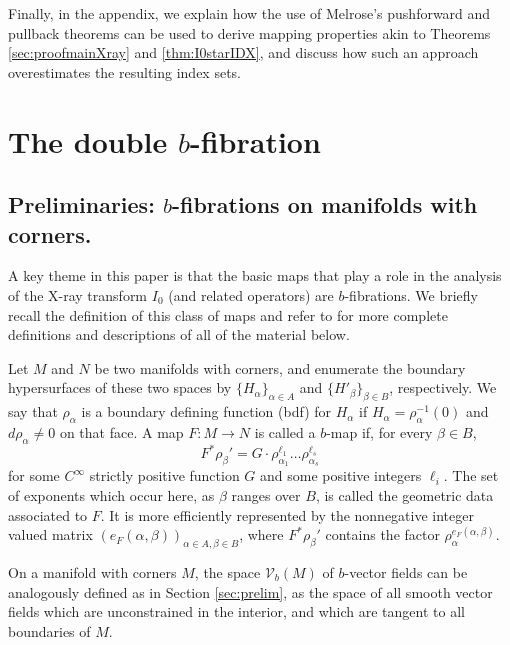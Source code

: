 \documentclass[JEP,XML,SOM,Unicode,NoFloatCountersInSection, NoEqCountersInSection,published]{cedram}
\theoremstyle{plain}
\theoremstyle{definition}
\theoremstyle{remark}
\begin{document}
Finally, in the appendix, we explain how the use of Melrose's pushforward and pullback theorems can be used to derive mapping properties akin to Theorems \ref{sec:proofmainXray} and \ref{thm:I0starIDX}, and discuss how such an approach overestimates the resulting index sets.

\section{The double \texorpdfstring{$b$}{b}-fibration} \label{sec:doubleb}

\subsection{Preliminaries: $b$-fibrations on manifolds with corners.} \label{sec:bfib}

A key theme in this paper is that the basic maps that play a role in the analysis of the X-ray transform $I_0$
(and related operators) are $b$-fibrations. We briefly recall the definition of this class of maps and refer to
\cite{Grieser2001,Melrose1992, Mazzeo1991} for more complete definitions and descriptions of all of the material below.

Let $M$ and $N$ be two manifolds with corners, and enumerate the boundary hypersurfaces of these two spaces by $\{H_\alpha\}_{\alpha \in A}$
and $\{H'_\beta\}_{\beta \in B}$, respectively. We say that $\rho_\alpha$ is a boundary defining function (bdf) for $H_\alpha$ if
$H_\alpha = \rho_\alpha^{-1}(0)$ and $d\rho_\alpha \neq 0$ on that face. A map $F: M \to N$ is called a $b$-map if, for every $\beta \in B$,
\[
F^* \rho_\beta' = G \cdot \rho_{\alpha_1}^{\ell_1} \ldots \rho_{\alpha_s}^{\ell_s}
\]
for some $C^\infty$ strictly positive function $G$ and some positive integers $\ell_i$. The set of exponents which occur here,
as $\beta$ ranges over $B$, is called the geometric data associated to $F$. It is more efficiently represented by the nonnegative
integer valued matrix $(e_F(\alpha, \beta))_{\alpha\in A, \beta\in B}$, where $F^*\rho_\beta'$ contains the factor $\rho_\alpha^{e_F(\alpha, \beta)}$.

On a manifold with corners $M$, the space $\mathcal V_b(M)$ of $b$-vector fields can be analogously defined as in Section \ref{sec:prelim}, as the space of all smooth vector fields which are unconstrained in the interior, and which are tangent to all boundaries of $M$.
\end{document}
